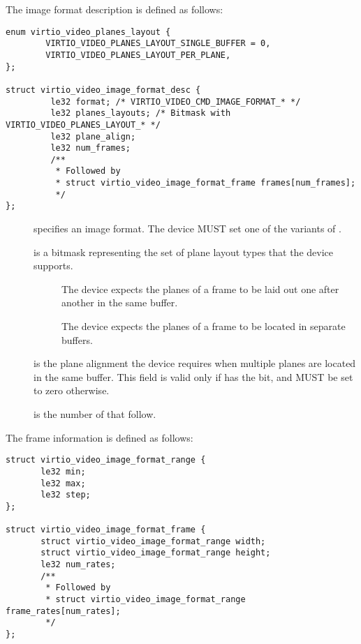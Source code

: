 \begin{description}
The image format description  is defined
as follows:
\begin{lstlisting}
enum virtio_video_planes_layout {
        VIRTIO_VIDEO_PLANES_LAYOUT_SINGLE_BUFFER = 0,
        VIRTIO_VIDEO_PLANES_LAYOUT_PER_PLANE,
};

struct virtio_video_image_format_desc {
         le32 format; /* VIRTIO_VIDEO_CMD_IMAGE_FORMAT_* */
         le32 planes_layouts; /* Bitmask with VIRTIO_VIDEO_PLANES_LAYOUT_* */
         le32 plane_align;
         le32 num_frames;
         /**
          * Followed by
          * struct virtio_video_image_format_frame frames[num_frames];
          */
};
\end{lstlisting}
\begin{description}
\item[] specifies an image format. The device MUST set
  one of the variants of .
\item[] is a bitmask representing the set of plane layout
  types that the device supports.
  \begin{description}
  \item[] The device expects
    the planes of a frame to be laid out one after another in the same buffer.
  \item[] The device expects the
    planes of a frame to be located in separate buffers.
  \end{description}
\item[] is the plane alignment the device requires when
  multiple planes are located in the same buffer. This field is valid only if
   has the 
  bit, and MUST be set to zero otherwise.
\item[] is the number of 
  that follow.
\end{description}

The frame information  is defined as follows:
\begin{lstlisting}
struct virtio_video_image_format_range {
       le32 min;
       le32 max;
       le32 step;
};

struct virtio_video_image_format_frame {
       struct virtio_video_image_format_range width;
       struct virtio_video_image_format_range height;
       le32 num_rates;
       /**
        * Followed by
        * struct virtio_video_image_format_range frame_rates[num_rates];
        */
};
\end{lstlisting}


\end{description}
